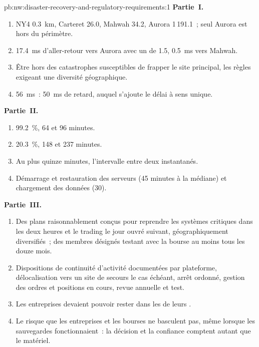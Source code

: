 \begin{solution}{pb:nw:disaster-recovery-and-regulatory-requirements:1}
\textbf{Partie~I.}
\begin{enumerate}
\item NY4 \qty{0.3}{\kilo\metre}, Carteret 26.0, Mahwah 34.2, Aurora 1\,191.1~; seul Aurora est hors du périmètre.
\item \qty{17.4}{\milli\second} d'aller-retour vers Aurora avec un  de 1.5, \qty{0.5}{\milli\second} vers Mahwah.
\item Être hors des catastrophes susceptibles de frapper le site principal, les règles exigeant une diversité géographique.
\item \qty{56}{\milli\second}~: \qty{50}{\milli\second} de retard, auquel s'ajoute le délai à sens unique.
\end{enumerate}
\textbf{Partie~II.}
\begin{enumerate}[resume]
\item 99.2~\%, 64 et 96 minutes.
\item 20.3~\%, 148 et 237 minutes.
\item Au plus quinze minutes, l'intervalle entre deux instantanés.
\item Démarrage et restauration des serveurs (45 minutes à la médiane) et chargement des données (30).
\end{enumerate}
\textbf{Partie~III.}
\begin{enumerate}[resume]
\item Des plans raisonnablement conçus pour reprendre les systèmes critiques dans les deux heures et le trading le jour ouvré suivant, géographiquement diversifiés~;
  des membres désignés testant avec la bourse au moins tous les douze mois.
\item Dispositions de continuité d'activité documentées par plateforme, délocalisation vers un site de secours le cas échéant, arrêt ordonné, gestion
  des ordres et positions en cours, revue annuelle et test.
\item Les entreprises devaient pouvoir rester dans les  de leurs .
\item Le risque que les entreprises et les bourses ne basculent pas, même lorsque les sauvegardes fonctionnaient~: la décision et la confiance comptent
  autant que le matériel.

\end{enumerate}
\end{solution}
